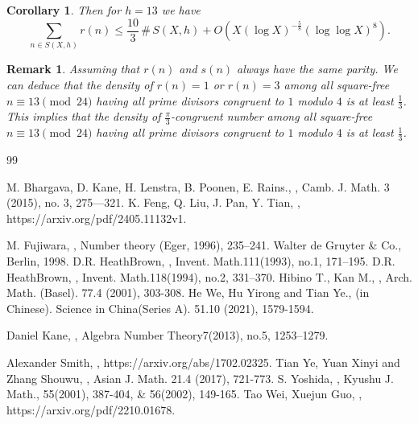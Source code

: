 \documentclass[11pt]{article}
\newtheorem{remark}[theorem]{Remark}
\newtheorem{corollary}[theorem]{Corollary}
\begin{document}
\begin{corollary}
Then for $h=13$ we have
$$\sum\limits_{n\in S(X,h)}r(n)\leq \frac{10}{3}\,\#\, S(X,h)+ O(X(\log X)^{-\frac{5}{8}}(\log \log X)^{8}).$$
\end{corollary}
\begin{remark} Assuming that $r(n)$ and $s(n)$ always have the same parity. We can deduce that the density of $r(n)=1$ or $r(n)=3$ among all square-free $n\equiv 13\pmod{24}$ having all prime divisors congruent to $1$ modulo $4$ is at least $\frac{1}{3}$. This implies that the density of $\frac{\pi}{3}$-congruent number among all square-free $n\equiv 13\pmod{24}$ having all prime divisors congruent to $1$ modulo $4$ is at least $\frac{1}{3}$.
\end{remark}




\begin{thebibliography}{99}

 M. Bhargava, D. Kane, H. Lenstra, B. Poonen, E. Rains., ,  Camb. J. Math. 3 (2015), no. 3, 275—321.
 K. Feng,  Q. Liu,  J. Pan, Y. Tian, ,  https://arxiv.org/pdf/2405.11132v1.

M. Fujiwara, ,  Number theory (Eger, 1996), 235–241.
Walter de Gruyter \& Co., Berlin, 1998.
D.R. HeathBrown,  , Invent. Math.111(1993), no.1, 171–195.
D.R. HeathBrown,  , Invent. Math.118(1994), no.2, 331–370.
 Hibino T., Kan M., , Arch. Math. (Basel). 77.4 (2001), 303-308.
 He We, Hu Yirong and Tian Ye.,  (in Chinese). Science in China(Series A). 51.10 (2021), 1579-1594.


Daniel Kane, , Algebra Number Theory7(2013), no.5, 1253–1279.


  Alexander Smith, ,  https://arxiv.org/abs/1702.02325.
 Tian Ye, Yuan Xinyi and Zhang Shouwu, , Asian J. Math. 21.4 (2017), 721-773.
 S. Yoshida, , Kyushu J. Math., 55(2001), 387-404,  \& 56(2002), 149-165.
Tao Wei, Xuejun Guo,  , https://arxiv.org/pdf/2210.01678.
\end{thebibliography}
\end{document}
